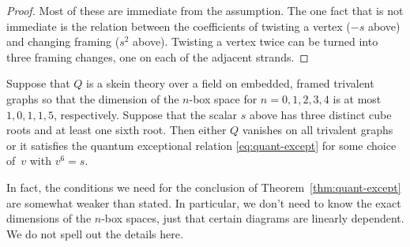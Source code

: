 \documentclass[12pt]{amsart}
\begin{document}
\begin{proof}
  Most of these are immediate from the assumption. The one fact that
  is not immediate is the relation between the coefficients of
  twisting a vertex ($-s$ above) and changing framing ($s^2$
  above). Twisting a vertex twice can be turned into three framing
  changes, one on each of the adjacent strands.
\end{proof}

\begin{theorem}\label{thm:quant-except}
  Suppose that $Q$ is a skein theory over a field on embedded, framed
  trivalent
  graphs so that the dimension of the $n$-box space for $n=0,1,2,3,4$
  is at most $1,0,1,1,5$, respectively. Suppose that the scalar $s$
  above has three distinct cube roots and at least one sixth root.
  Then either $Q$ vanishes on all trivalent
  graphs or it satisfies the quantum exceptional relation
  \eqref{eq:quant-except} for some choice of~$v$ with $v^6 = s$.
\end{theorem}

In fact, the conditions we need for the conclusion of
Theorem~\ref{thm:quant-except} are somewhat weaker than stated. In
particular, we
don't need to know the exact dimensions of the $n$-box spaces, just
that certain diagrams
are linearly dependent. We do not spell out the details here.
\end{document}
